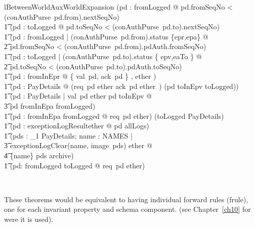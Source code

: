 \begin{LNewLemma}
\begin{theorem}{lBetweenWorldAuxWorldExpansion}
            (\forall pd : fromLogged @  pd.fromSeqNo < (conAuthPurse~pd.from).nextSeqNo) \land \\ \t1
            (\forall pd : toLogged @ pd.toSeqNo < (conAuthPurse~pd.to).nextSeqNo) \land  \\ \t1
            (\forall pd : fromLogged | (conAuthPurse~pd.from).status \in \{epr,epa\} @  \\ %
                \t2 pd.fromSeqNo < (conAuthPurse~pd.from).pdAuth.fromSeqNo) \land \\ \t1
            (\forall pd : toLogged | (conAuthPurse~pd.to).status \in \{ epv,eaTo \} @ \\ %
                \t2 pd.toSeqNo < (conAuthPurse~pd.to).pdAuth.toSeqNo) \land \\ \t1
            (\forall pd : fromInEpr @ \disjoint \langle \{ val~pd, ack~pd \} , ether \rangle) \land \\ \t1
            (\forall pd : PayDetails @ (req~pd \in ether \land ack~pd \notin ether~)
                \iff (pd \in toInEpv \cup toLogged)) \\ \t1
            \land (\forall pd : PayDetails | val~pd \in ether \land pd \in toInEpv @ \\ %
                \t3 pd \in fromInEpa \cup fromLogged) \land \\ \t1
            (\forall pd : fromInEpa \cup fromLogged @  req~pd \in ether) \land
            (toLogged \in \finset PayDetails) \land \\ \t1
            (\forall pd : exceptionLogResult\inv \limg ether \rimg @ pd \in allLogs) \land \\ \t1
            (\forall pds : \power_1 PayDetails; name : NAMES | \\ %
                    \t3 exceptionLogClear(name, image~pds) \in ether @ \\ %
                \t4 \{name\} \cross pds \subseteq archive) \land \\ \t1
            (\forall pd: fromLogged \cup toLogged @ req~pd \in ether)
\end{theorem}~\end{LNewLemma}
%
These theorems would be equivalent to having individual forward rules (frule),
one for each invariant property and schema component. (see Chapter~\ref{ch10} for
were it is used).
%
